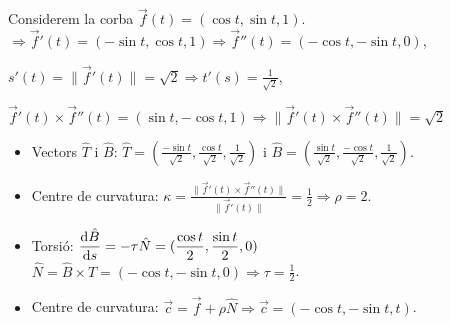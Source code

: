 \begin{example}
    Considerem la corba $\vec{f}(t) = (\cos t, \sin t, 1)$.
    \\
    $\Rightarrow \vec{f}'(t) = (-\sin t, \cos t, 1) \Rightarrow \vec{f}''(t) = (-\cos t, -\sin t, 0)$, 
    
    $\displaystyle s'(t) = \| \vec{f}'(t) \| = \sqrt{2} \Rightarrow t'(s) = \frac{1}{\sqrt{2}}$, 
    
    $\vec{f}'(t) \times \vec{f}''(t) = (\sin t, -\cos t, 1) \Rightarrow \| \vec{f}'(t) \times \vec{f}''(t) \| = \sqrt{2}$
    \begin{itemize}
        \item Vectors $\hat{T}$ i $\hat{B}$:
            \subitem $\displaystyle\hat{T} = \left( \frac{-\sin t}{\sqrt{2}}, \frac{\cos t}{\sqrt{2}}, \frac{1}{\sqrt{2}} \right)$ i $\displaystyle \hat{B} = \left( \frac{\sin t}{\sqrt{2}}, \frac{-\cos t}{\sqrt{2}}, \frac{1}{\sqrt{2}} \right)$.
        \item Centre de curvatura: 
            \subitem $\displaystyle \kappa = \frac{\| \vec{f}'(t) \times \vec{f}''(t) \|}{\| \vec{f}'(t) \|} = \frac{1}{2} \Rightarrow \rho = 2$.
        \item Torsió: 
            \subitem $\displaystyle \frac{\mathrm{d} \hat{B}}{\mathrm{d} s} = - \tau \hat{N} = (\frac{\cos t}{2}, \frac{\sin t}{2}, 0)$
            \subitem $\displaystyle \hat{N} = \hat{B} \times \hat{T} = (-\cos t, -\sin t, 0) \Rightarrow \tau = \frac{1}{2}$.
        \item Centre de curvatura: 
            \subitem $\vec{c} = \vec{f} + \rho \hat{N} \Rightarrow \vec{c} = (-\cos t, -\sin t, t)$.
        \end{itemize}
\end{example}
